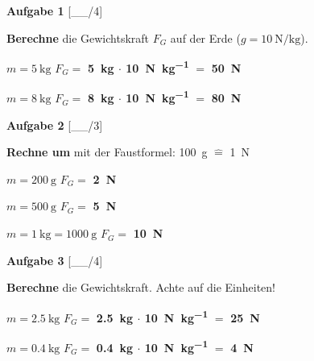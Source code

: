 \documentclass[11pt, a4paper]{article}
\newcommand{\lsg}[1]{\textcolor{loesung}{\textbf{#1}}}
\newif\ifzeigesternchen
\newcommand{\punktebox}[1]{\hfill\small\textcolor{mittelgrau}{[\_\_/#1]}}
\newcommand{\stern}[1]{%
    \ifzeigesternchen%
        \textsuperscript{\textcolor{fachfarbe}{(#1)}}%
    \fi%
}
\newcommand{\aufgabe}[2]{%
    \needspace{4\baselineskip}%
    \vspace{10pt}%
    \noindent\textbf{\textcolor{fachfarbe}{Aufgabe #1}} #2%
    \vspace{4pt}%
    \nopagebreak[4]%
}
\newcommand{\operator}[1]{\textbf{\textcolor{fachfarbe}{#1}}}
\begin{document}
\vspace{0.3em}


\aufgabe{1}{\stern{*}} \punktebox{4}

\operator{Berechne} die Gewichtskraft $F_G$ auf der Erde ($g = \SI{10}{\newton\per\kilogram}$).

\vspace{0.2em}
\begin{teil}
    \item $m = \SI{5}{\kilogram}$ \hfill $F_G = $ \lsg{\SI{5}{\kilogram} $\cdot$ \SI{10}{\newton\per\kilogram}} $= $ \lsg{\SI{50}{\newton}}
    \item $m = \SI{8}{\kilogram}$ \hfill $F_G = $ \lsg{\SI{8}{\kilogram} $\cdot$ \SI{10}{\newton\per\kilogram}} $= $ \lsg{\SI{80}{\newton}}
\end{teil}


\aufgabe{2}{\stern{*}} \punktebox{3}

\operator{Rechne um} mit der Faustformel: \SI{100}{\gram} $\hat{=}$ \SI{1}{\newton}

\vspace{0.2em}
\begin{teil}
    \item $m = \SI{200}{\gram}$ \hfill $F_G = $ \lsg{\SI{2}{\newton}}
    \item $m = \SI{500}{\gram}$ \hfill $F_G = $ \lsg{\SI{5}{\newton}}
    \item $m = \SI{1}{\kilogram} = \SI{1000}{\gram}$ \hfill $F_G = $ \lsg{\SI{10}{\newton}}
\end{teil}


\aufgabe{3}{\stern{**}} \punktebox{4}

\operator{Berechne} die Gewichtskraft. Achte auf die Einheiten!

\vspace{0.2em}
\begin{teil}
    \item $m = \SI{2,5}{\kilogram}$ \hfill $F_G = $ \lsg{\SI{2,5}{\kilogram} $\cdot$ \SI{10}{\newton\per\kilogram}} $= $ \lsg{\SI{25}{\newton}}
    \item $m = \SI{0,4}{\kilogram}$ \hfill $F_G = $ \lsg{\SI{0,4}{\kilogram} $\cdot$ \SI{10}{\newton\per\kilogram}} $= $ \lsg{\SI{4}{\newton}}
\end{teil}
\end{document}
